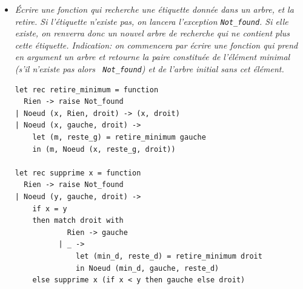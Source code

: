 \documentclass[11pt, a4paper]{article}
\begin{document}
\begin{itemize}
        \emph{On en déduit alors un algorithme de tri de liste. On
        part d'un arbre de recherche vide dans lequel on insère
        successivement toutes les valeurs de la liste à trier. Il ne
        reste plus qu'à afficher par ordre croissant les étiquettes de
        cet arbre grâce à la fonction précédente. L'ordre dans lequel
        on réalise les insertions est-il significatif?}

        \smallskip

\begin{verbatim}
let tri_liste l =
  infixe (List.fold_right ajout l Rien)
\end{verbatim}

        \noindent
        L'ordre d'insertion n'est pas significatif pour la correction
        de l'algorithme.

        \smallskip

  \item \emph{Écrire une fonction qui recherche une étiquette donnée
        dans un arbre, et la retire. Si l'étiquette n'existe pas, on
        lancera l'exception {\tt Not\_found}. Si elle existe, on
        renverra donc un nouvel arbre de recherche qui ne contient
        plus cette étiquette. Indication: on commencera par écrire une
        fonction qui prend en argument un arbre et retourne la paire
        constituée de l'élément minimal (s'il n'existe pas alors {\tt
        Not\_found}) et de l'arbre initial sans cet élément.}

        \smallskip

\begin{verbatim}
let rec retire_minimum = function
  Rien -> raise Not_found
| Noeud (x, Rien, droit) -> (x, droit)
| Noeud (x, gauche, droit) ->
    let (m, reste_g) = retire_minimum gauche
    in (m, Noeud (x, reste_g, droit))

let rec supprime x = function
  Rien -> raise Not_found
| Noeud (y, gauche, droit) ->
    if x = y
    then match droit with
            Rien -> gauche
          | _ ->
              let (min_d, reste_d) = retire_minimum droit
              in Noeud (min_d, gauche, reste_d)
    else supprime x (if x < y then gauche else droit)
\end{verbatim}

\end{itemize}
\end{document}
